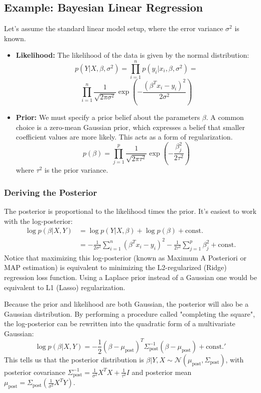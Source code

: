 \documentclass{article}
\begin{document}
\begin{multicols}{2}
	\subsection{Example: Bayesian Linear Regression}
	Let's assume the standard linear model setup, where the error variance $\sigma^2$ is known.
	\begin{itemize}
		\item \textbf{Likelihood:} The likelihood of the data is given by the normal distribution:
		      $$ p(Y|X, \beta, \sigma^2) = \prod_{i=1}^{n} p(y_i|x_i, \beta, \sigma^2) = $$
		      $$ \prod_{i=1}^{n} \frac{1}{\sqrt{2\pi\sigma^2}} \exp\left(-\frac{(\beta^T x_i - y_i)^2}{2\sigma^2}\right) $$
		\item \textbf{Prior:} We must specify a prior belief about the parameters $\beta$. A common choice is a zero-mean Gaussian prior, which expresses a belief that smaller coefficient values are more likely. This acts as a form of regularization.
		      $$ p(\beta) = \prod_{j=1}^{p} \frac{1}{\sqrt{2\pi\tau^2}} \exp\left(-\frac{\beta_j^2}{2\tau^2}\right) $$
		      where $\tau^2$ is the prior variance.
	\end{itemize}

	\subsubsection{Deriving the Posterior}
	The posterior is proportional to the likelihood times the prior. It's easiest to work with the log-posterior:
	\begin{align*}
		\log p(\beta|X, Y) & = \log p(Y|X, \beta) + \log p(\beta) + \text{const.}                                                                     \\
		                   & = -\frac{1}{2\sigma^2} \sum_{i=1}^{n} (\beta^T x_i - y_i)^2 - \frac{1}{2\tau^2} \sum_{j=1}^{p} \beta_j^2 + \text{const.}
	\end{align*}
	Notice that maximizing this log-posterior (known as Maximum A Posteriori or MAP estimation) is equivalent to minimizing the L2-regularized (Ridge) regression loss function. Using a Laplace prior instead of a Gaussian one would be equivalent to L1 (Lasso) regularization.

	Because the prior and likelihood are both Gaussian, the posterior will also be a Gaussian distribution. By performing a procedure called "completing the square", the log-posterior can be rewritten into the quadratic form of a multivariate Gaussian:
	$$ \log p(\beta|X,Y) = -\frac{1}{2}(\beta - \mu_{\text{post}})^T \Sigma_{\text{post}}^{-1}(\beta - \mu_{\text{post}}) + \text{const.}' $$
	This tells us that the posterior distribution is $\beta|Y, X \sim \mathcal{N}(\mu_{\text{post}}, \Sigma_{\text{post}})$, with posterior covariance $\Sigma_{\text{post}}^{-1} = \frac{1}{\sigma^2}X^T X + \frac{1}{\tau^2}I$ and posterior mean $\mu_{\text{post}} = \Sigma_{\text{post}}\left(\frac{1}{\sigma^2}X^T Y\right)$.


\end{multicols}
\end{document}
